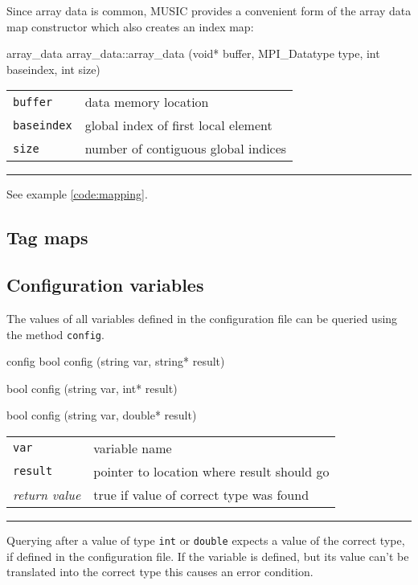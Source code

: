 \documentclass[a4paper]{report}
\makeatletter
\newenvironment{parameters}%
{\begin{tabular}{@{\hspace{2em}}lp{0.6\textwidth}}}%
{\end{tabular}\par\vspace{1mm}\par\hrule\par\vspace{5mm}}
\makeatother
\begin{document}
Since array data is common, MUSIC provides a convenient form of the
array data map constructor which also creates an index map:

\begin{head}{array_data}
  array_data::array_data (void* buffer,
                          MPI_Datatype type,
                          int  baseindex,
                          int size)
\end{head}
\begin{parameters}
  \lstinline|buffer|    & data memory location \\
  \lstinline|baseindex| & global index of first local element \\
  \lstinline|size|      & number of contiguous global indices \\
\end{parameters}

See example \ref{code:mapping}.


\subsection{Tag maps}
\label{sec:tagmap}



\subsection{Configuration variables}

The values of all variables defined in the configuration file can be
queried using the method \lstinline|config|.

\begin{head}{config}
  bool config (string var, string* result)

  bool config (string var, int* result)

  bool config (string var, double* result)
\end{head}
\begin{parameters}
  \lstinline|var|     & variable name \\
  \lstinline|result|  & pointer to location where result should go \\
  \emph{return value} & true if value of correct type was found \\
\end{parameters}

Querying after a value of type \lstinline|int| or \lstinline|double|
expects a value of the correct type, if defined in the configuration
file.  If the variable is defined, but its value can't be translated
into the correct type this causes an error condition.
\end{document}
